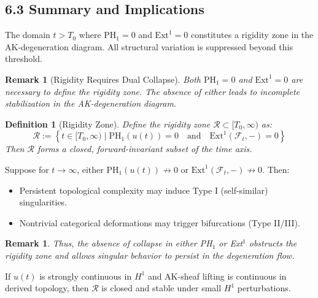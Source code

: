 \documentclass[11pt]{article}
\newtheorem{definition}[theorem]{Definition}
\newtheorem{remark}[theorem]{Remark}
\begin{document}
\subsection{6.3 Summary and Implications}

\begin{corollary}
The domain $t > T_0$ where $\mathrm{PH}_1 = 0$ and $\mathrm{Ext}^1 = 0$ constitutes a rigidity zone in the AK-degeneration diagram. All structural variation is suppressed beyond this threshold.
\end{corollary}

\begin{remark}[Rigidity Requires Dual Collapse]
Both $\mathrm{PH}_1 = 0$ and $\mathrm{Ext}^1 = 0$ are necessary to define the rigidity zone. The absence of either leads to incomplete stabilization in the AK-degeneration diagram.
\end{remark}

\begin{definition}[Rigidity Zone]
Define the rigidity zone $\mathcal{R} \subset [T_0, \infty)$ as:
\[
\mathcal{R} := \left\{ t \in [T_0, \infty) \mid \mathrm{PH}_1(u(t)) = 0 \quad \text{and} \quad \mathrm{Ext}^1(\mathcal{F}_t, -) = 0 \right\}
\]
Then $\mathcal{R}$ forms a closed, forward-invariant subset of the time axis.
\end{definition}

\begin{proposition}
Suppose for $t \to \infty$, either $\mathrm{PH}_1(u(t)) \not\to 0$ or $\mathrm{Ext}^1(\mathcal{F}_t, -) \not\to 0$. Then:

\begin{itemize}
    \item Persistent topological complexity may induce Type I (self-similar) singularities.
    \item Nontrivial categorical deformations may trigger bifurcations (Type II/III).
\end{itemize}
\end{proposition}

\begin{remark}
Thus, the absence of collapse in either PH$_1$ or Ext$^1$ obstructs the rigidity zone and allows singular behavior to persist in the degeneration flow.
\end{remark}

\begin{lemma}
If $u(t)$ is strongly continuous in $H^1$ and AK-sheaf lifting is continuous in derived topology, then $\mathcal{R}$ is closed and stable under small $H^1$ perturbations.
\end{lemma}
\end{document}

